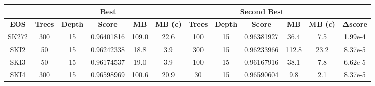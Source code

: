 \begin{table}[]
\centering
\begin{tabular}{@{}|c|ccccc|ccccc|c|@{}}
\toprule
\multicolumn{1}{|l|}{} & \multicolumn{5}{c|}{Best}                                                                                                                                            & \multicolumn{5}{c|}{Second Best}                                                                                                                                     &                 \\ \midrule
\textbf{EOS}           & \multicolumn{1}{c|}{\textbf{Trees}} & \multicolumn{1}{c|}{\textbf{Depth}} & \multicolumn{1}{c|}{\textbf{Score}} & \multicolumn{1}{c|}{\textbf{MB}} & \textbf{MB (c)} & \multicolumn{1}{c|}{\textbf{Trees}} & \multicolumn{1}{c|}{\textbf{Depth}} & \multicolumn{1}{c|}{\textbf{Score}} & \multicolumn{1}{c|}{\textbf{MB}} & \textbf{MB (c)} & \textbf{Δscore} \\ \midrule
SK272                  & \multicolumn{1}{c|}{300}            & \multicolumn{1}{c|}{15}             & \multicolumn{1}{c|}{0.96401816}     & \multicolumn{1}{c|}{109.0}       & 22.6            & \multicolumn{1}{c|}{100}            & \multicolumn{1}{c|}{15}             & \multicolumn{1}{c|}{0.96381927}     & \multicolumn{1}{c|}{36.4}        & 7.5             & 1.99e-4         \\ \midrule
SKI2                   & \multicolumn{1}{c|}{50}             & \multicolumn{1}{c|}{15}             & \multicolumn{1}{c|}{0.96242338}     & \multicolumn{1}{c|}{18.8}        & 3.9             & \multicolumn{1}{c|}{300}            & \multicolumn{1}{c|}{15}             & \multicolumn{1}{c|}{0.96233966}     & \multicolumn{1}{c|}{112.8}       & 23.2            & 8.37e-5         \\ \midrule
SKI3                   & \multicolumn{1}{c|}{50}             & \multicolumn{1}{c|}{15}             & \multicolumn{1}{c|}{0.96174537}     & \multicolumn{1}{c|}{19.0}        & 3.9             & \multicolumn{1}{c|}{100}            & \multicolumn{1}{c|}{15}             & \multicolumn{1}{c|}{0.96167916}     & \multicolumn{1}{c|}{38.1}        & 7.8             & 6.62e-5         \\ \midrule
SKI4                   & \multicolumn{1}{c|}{300}            & \multicolumn{1}{c|}{15}             & \multicolumn{1}{c|}{0.96598969}     & \multicolumn{1}{c|}{100.6}       & 20.9            & \multicolumn{1}{c|}{30}             & \multicolumn{1}{c|}{15}             & \multicolumn{1}{c|}{0.96590604}     & \multicolumn{1}{c|}{9.8}         & 2.1             & 8.37e-5         \\ \midrule

\end{tabular}
\end{table}

